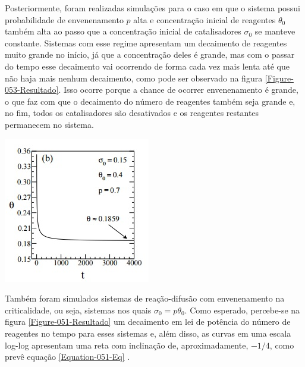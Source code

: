 Posteriormente, foram realizadas simulações para o caso em que o sistema possui
probabilidade de envenenamento $p$ alta e concentração inicial de reagentes
$\theta_0$ também alta ao passo que a concentração inicial de catalisadores
$\sigma_0$ se manteve constante. Sistemas com esse regime apresentam um
decaimento de reagentes muito grande no início, já que a concentração deles
é grande, mas com o passar do tempo esse decaimento vai ocorrendo de forma
cada vez mais lenta até que não haja mais nenhum decaimento, como pode ser
observado na figura \ref{Figure-053-Resultado}. Isso ocorre porque a chance de
ocorrer envenenamento é grande, o que faz com que o decaimento do número de
reagentes também seja grande e, no fim, todos os catalisadores são desativados e
os reagentes restantes permanecem no sistema.

{ \centering
	\captionsetup{type=figure}
	\hfill \break
	\includegraphics[width=\columnwidth]{./figures/053-Resultado.jpg}
	\label{Figure-053-Resultado}
}

Também foram simulados sistemas de reação-difusão com envenenamento na
criticalidade, ou seja, sistemas nos quais $\sigma_0 = p \theta_0$. Como
esperado, percebe-se na figura \ref{Figure-051-Resultado} um decaimento em lei
de potência do número de reagentes no tempo para esses sistemas e, além disso,
as curvas em uma escala log-log apresentam uma reta com inclinação de,
aproximadamente, $-1/4$, como prevê equação \ref{Equation-051-Eq} \cite{3}.


